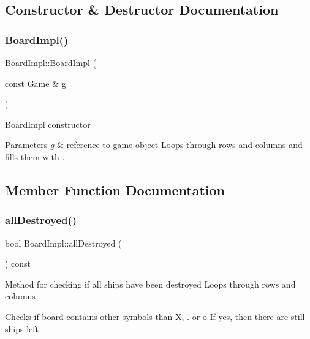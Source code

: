 \subsection{Constructor \& Destructor Documentation}
\mbox{\label{class_board_impl_a2c3f1cce7def17781c0025d1e68d0af5}} 
\subsubsection{\texorpdfstring{Board\+Impl()}{BoardImpl()}}
{\footnotesize\ttfamily Board\+Impl\+::\+Board\+Impl (\begin{DoxyParamCaption}\item[{const \mbox{\hyperlink{class_game}{Game}} \&}]{g }\end{DoxyParamCaption})}

\mbox{\hyperlink{class_board_impl}{Board\+Impl}} constructor 
\begin{DoxyParams}{Parameters}
{\em g} & reference to game object Loops through rows and columns and fills them with \textquotesingle{}.\textquotesingle{} \\
\hline
\end{DoxyParams}


\subsection{Member Function Documentation}
\mbox{\label{class_board_impl_a00ae397df7ab1a47868078a2e0ec54b8}} 
\subsubsection{\texorpdfstring{all\+Destroyed()}{allDestroyed()}}
{\footnotesize\ttfamily bool Board\+Impl\+::all\+Destroyed (\begin{DoxyParamCaption}{ }\end{DoxyParamCaption}) const}

Method for checking if all ships have been destroyed Loops through rows and columns

Checks if board contains other symbols than \textquotesingle{}X\textquotesingle{}, \textquotesingle{}.\textquotesingle{} or \textquotesingle{}o\textquotesingle{} If yes, then there are still ships left\mbox{\label{class_board_impl_afd58266f5c81679fef78c0d1abb9d0d5}} 
